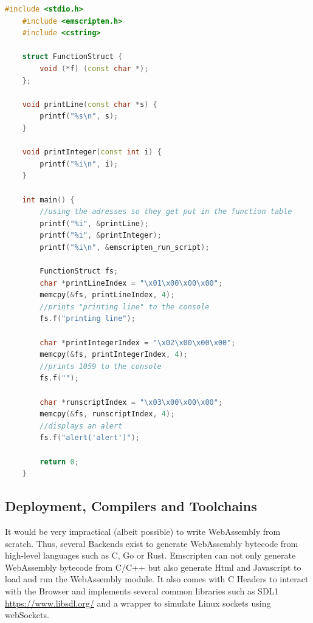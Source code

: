 \documentclass[sigconf]{acmart}
\begin{document}
\begin{lstlisting}[language=C++, caption={Example demonstrating how function pointer type checking works.}, label={fig:wasm_function_type_checking}]
	#include <stdio.h>
	#include <emscripten.h>
	#include <cstring>

	struct FunctionStruct {
		void (*f) (const char *);
	};

	void printLine(const char *s) {
		printf("%s\n", s);
	}

	void printInteger(const int i) {
		printf("%i\n", i);
	}

	int main() {	
		//using the adresses so they get put in the function table
		printf("%i", &printLine);
		printf("%i", &printInteger);
		printf("%i\n", &emscripten_run_script);
		
		FunctionStruct fs;
		char *printLineIndex = "\x01\x00\x00\x00";
		memcpy(&fs, printLineIndex, 4);
		//prints "printing line" to the console
		fs.f("printing line"); 
		
		char *printIntegerIndex = "\x02\x00\x00\x00";
		memcpy(&fs, printIntegerIndex, 4);
		//prints 1059 to the console
		fs.f("");
		
		char *runscriptIndex = "\x03\x00\x00\x00";
		memcpy(&fs, runscriptIndex, 4);
		//displays an alert
		fs.f("alert('alert')");		
		
		return 0;
	}
\end{lstlisting}

\subsection{Deployment, Compilers and Toolchains}
It would be very impractical (albeit possible) to write WebAssembly from scratch. Thus, several Backends exist to generate WebAssembly bytecode from high-level languages such as C, Go or Rust. Emscripten can not only generate WebAssembly bytecode from C/C++ but also generate Html and Javascript to load and run the WebAssembly module. It also comes with C Headers to interact with the Browser and implements several common libraries such as SDL1 \url{https://www.libsdl.org/} and a wrapper to simulate Linux sockets using webSockets.  
\end{document}
